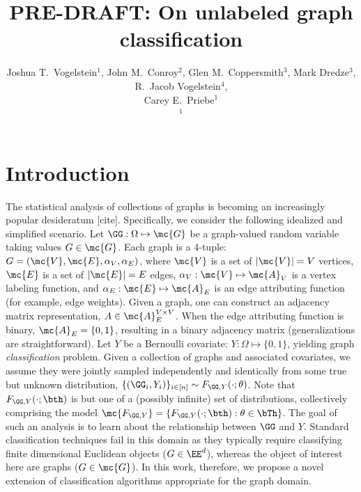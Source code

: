  
\usepackage{url}
\usepackage{subfigure}

\title{PRE-DRAFT: On unlabeled graph classification}

\author{Joshua T.~Vogelstein$^1$, John M.~Conroy$^2$, Glen M.~Coppersmith$^3$, Mark Dredze$^3$, R.~Jacob Vogelstein$^4$, \\ Carey E.~Priebe$^1$ \\ $^1$ }



\maketitle


\section{Introduction}

The statistical analysis of collections of graphs is becoming an increasingly popular desideratum [cite].  Specifically, we consider the following idealized and simplified scenario. Let $\GG: \Omega \mapsto \mc{G}$ be a graph-valued random variable taking values $G\in \mc{G}$. Each graph is a 4-tuple: $G=(\mc{V},\mc{E},\alpha_V,\alpha_E)$, where $\mc{V}$ is a set of $|\mc{V}|=V$ vertices, $\mc{E}$ is a set of $|\mc{E}|=E$ edges, $\alpha_V: \mc{V} \mapsto \mc{A}_V$ is a vertex labeling function, and $\alpha_E: \mc{E} \mapsto \mc{A}_E$ is an edge attributing function (for example, edge weights).  Given a graph, one can construct an adjacency matrix representation, $A \in \mc{A}_E^{V \times V}$.  When the edge attributing function is binary, $\mc{A}_E=\{0,1\}$, resulting in a binary adjacency matrix (generalizations are straightforward).  Let $Y$ be a Bernoulli covariate: $Y: \Omega \mapsto \{0,1\}$, yielding graph \emph{classification} problem.  Given a collection of graphs and associated covariates,  we assume they were jointly sampled independently and identically from some true but unknown distribution, $\{(\GG_i,Y_i)\}_{i \in [n]} \sim F_{\GG,Y}(\cdot; \theta)$.  Note that $F_{\GG,Y}(\cdot; \bth)$ is but one of a (possibly infinite) set of distributions, collectively comprising the model $\mc{F_{\GG,Y}}=\{F_{\GG,Y}(\cdot; \bth) : \theta \in \bTh\}$.  The goal of such an analysis is to learn about the relationship between $\GG$ and $Y$.   Standard classification techniques fail in this domain as they typically require classifying finite dimensional Euclidean objects ($G \in \EE^d$), whereas the object of interest here are graphs ($G \in \mc{G}$).   In this work, therefore, we propose a novel extension of classification algorithms appropriate for the graph domain.



